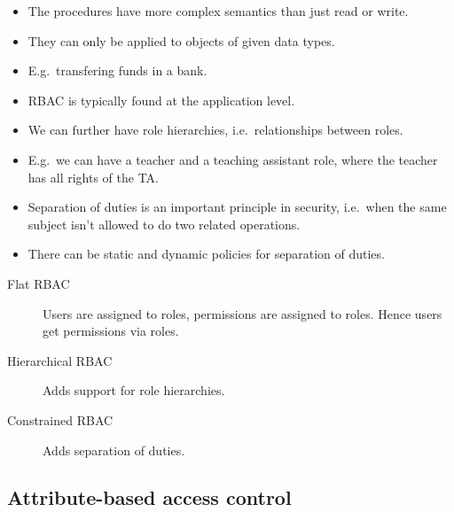 \begin{frame}
  \begin{itemize}
    \item The procedures have more complex semantics than just read or write.

    \item They can only be applied to objects of given data types.

    \item E.g.\ transfering funds in a bank.

    \item RBAC is typically found at the application level.
  \end{itemize}
\end{frame}

\begin{frame}
  \begin{itemize}
    \item We can further have role hierarchies, i.e.\ relationships between 
      roles.

    \item E.g.\ we can have a teacher and a teaching assistant role, where the 
      teacher has all rights of the TA\@.

    \item Separation of duties is an important principle in security, i.e.\ 
      when the same subject isn't allowed to do two related operations.

    \item There can be static and dynamic policies for separation of duties.

  \end{itemize}
\end{frame}

\begin{frame}
  \begin{description}
    \item[Flat RBAC] Users are assigned to roles, permissions are assigned to 
      roles.
      Hence users get permissions via roles.

    \item[Hierarchical RBAC]
      Adds support for role hierarchies.

    \item[Constrained RBAC]
      Adds separation of duties.
  \end{description}
\end{frame}

\subsection{Attribute-based access control}

